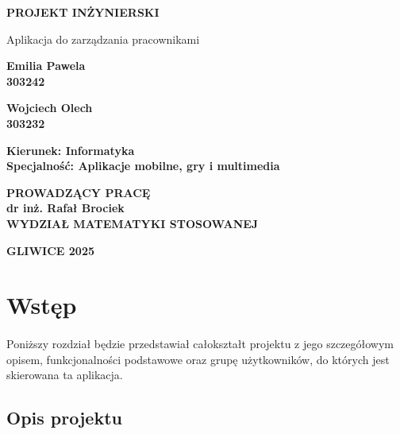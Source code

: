 \documentclass[12pt,a4paper]{article}
\begin{document}
\clearpage
\begin{figure}[h]
\centering
\end{figure}
\hspace{10cm}
\begin{center}\large\textbf{PROJEKT INŻYNIERSKI}\end{center}
\hspace{5cm}
\begin{center}Aplikacja do zarządzania pracownikami\end{center}
\hspace{5cm}
\begin{center}\large\textbf{Emilia Pawela\\303242}\end{center}
\begin{center}\large\textbf{Wojciech Olech\\303232}\end{center}
\hspace{5cm}
\begin{center}\large\textbf{Kierunek: Informatyka\\Specjalność: Aplikacje mobilne, gry i multimedia}\end{center}
\hspace{5cm}
\begin{center}\large\textbf{PROWADZĄCY PRACĘ\\dr inż. Rafał Brociek\\WYDZIAŁ MATEMATYKI STOSOWANEJ}\end{center}
\hspace{5cm}
\begin{center}\large\textbf{GLIWICE 2025}\end{center}

\newpage
{}
\tableofcontents

\newpage
\section{Wstęp}
\paragraph{ }Poniższy rozdział będzie przedstawiał całokształt projektu z jego szczegółowym opisem, funkcjonalności podstawowe oraz grupę użytkowników, do których jest skierowana ta aplikacja.
\subsection{Opis projektu}
\end{document}
